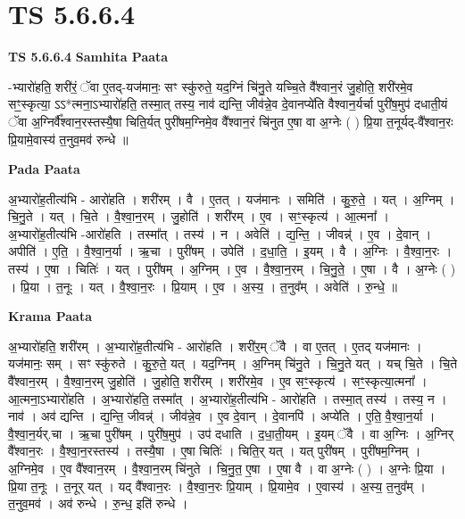 \documentclass[17pt]{extarticle}
\begin{document}
\section{ TS 5.6.6.4 }

\textbf{TS 5.6.6.4 } \newline
\textbf{Samhita Paata} \newline

-भ्यारो॑हति॒ शरी॑रं॒ ॅवा ए॒तद्-यज॑मानः॒ सꣳ स्कु॑रुते॒ यद॒ग्निं चि॑नु॒ते यच्चि॒ते वै᳚श्वान॒रं जु॒होति॒ शरी॑रमे॒व सꣳ॒॒स्कृत्या॒ ऽऽ*त्मना॒ऽभ्यारो॑हति॒ तस्मा॒त् तस्य॒ नाव॑ द्यन्ति॒ जीव॑न्ने॒व दे॒वानप्ये॑ति वैश्वान॒र्यर्चा पुरी॑ष॒मुप॑ दधाती॒यं ॅवा अ॒ग्निर्वै᳚श्वान॒रस्तस्यै॒षा चिति॒र्यत् पुरी॑षम॒ग्निमे॒व वै᳚श्वान॒रं चि॑नुत ए॒षा वा अ॒ग्नेः ( ) प्रि॒या त॒नूर्यद्-वै᳚श्वान॒रः प्रि॒यामे॒वास्य॑ त॒नुव॒मव॑ रुन्धे ॥ \newline

\textbf{Pada Paata} \newline

अ॒भ्यारो॑ह॒तीत्य॑भि - आरो॑हति । शरी॑रम् । वै । ए॒तत् । यज॑मानः । समिति॑ । कु॒रु॒ते॒ । यत् । अ॒ग्निम् । चि॒नु॒ते । यत् । चि॒ते । वै॒श्वा॒न॒रम् । जु॒होति॑ । शरी॑रम् । ए॒व । सꣳ॒॒स्कृत्य॑ । आ॒त्मना᳚ । अ॒भ्यारो॑ह॒तीत्य॑भि -आरो॑हति । तस्मा᳚त् । तस्य॑ । न । अवेति॑ । द्य॒न्ति॒ । जीवन्न्॑ । ए॒व । दे॒वान् । अपीति॑ । ए॒ति॒ । वै॒श्वा॒न॒र्या । ऋ॒चा । पुरी॑षम् । उपेति॑ । द॒धा॒ति॒ । इ॒यम् । वै । अ॒ग्निः । वै॒श्वा॒न॒रः । तस्य॑ । ए॒षा । चितिः॑ । यत् । पुरी॑षम् । अ॒ग्निम् । ए॒व । वै॒श्वा॒न॒रम् । चि॒नु॒ते॒ । ए॒षा । वै । अ॒ग्नेः ( ) । प्रि॒या । त॒नूः । यत् । वै॒श्वा॒न॒रः । प्रि॒याम् । ए॒व । अ॒स्य॒ । त॒नुव᳚म् । अवेति॑ । रु॒न्धे॒ ॥  \newline


\textbf{Krama Paata} \newline

अ॒भ्यारो॑हति॒ शरी॑रम् । अ॒भ्यारो॑ह॒तीत्य॑भि - आरो॑हति । शरी॑र॒म् ॅवै । वा ए॒तत् । ए॒तद् यज॑मानः । यज॑मानः॒ सम् । सꣳ स्कु॑रुते । कु॒रु॒ते॒ यत् । यद॒ग्निम् । अ॒ग्निम् चि॑नु॒ते । चि॒नु॒ते यत् । यच् चि॒ते । चि॒ते वै᳚श्वान॒रम् । वै॒श्वा॒न॒रम् जु॒होति॑ । जु॒होति॒ शरी॑रम् । शरी॑रमे॒व । ए॒व सꣳ॒॒स्कृत्य॑ । सꣳ॒॒स्कृत्या॒त्मना᳚ । आ॒त्मना॒ऽभ्यारो॑हति । अ॒भ्यारो॑हति॒ तस्मा᳚त् । अ॒भ्यारो॑ह॒तीत्य॑भि - आरो॑हति । तस्मा॒त् तस्य॑ । तस्य॒ न । नाव॑ । अव॑ द्यन्ति । द्य॒न्ति॒ जीवन्न्॑ । जीव॑न्ने॒व । ए॒व दे॒वान् । दे॒वानपि॑ । अप्ये॑ति । ए॒ति॒ वै॒श्वा॒न॒र्या । वै॒श्वा॒न॒र्यर्.चा । ऋ॒चा पुरी॑षम् । पुरी॑ष॒मुप॑ । उप॑ दधाति । द॒धा॒ती॒यम् । इ॒यम् ॅवै । वा अ॒ग्निः । अ॒ग्निर् वै᳚श्वान॒रः । वै॒श्वा॒न॒रस्तस्य॑ । तस्यै॒षा । ए॒षा चितिः॑ । चिति॒र् यत् । यत् पुरी॑षम् । पुरी॑षम॒ग्निम् । अ॒ग्निमे॒व । ए॒व वै᳚श्वान॒रम् । वै॒श्वा॒न॒रम् चि॑नुते । चि॒नु॒त॒ ए॒षा । ए॒षा वै । वा अ॒ग्नेः ( ) । अ॒ग्नेः प्रि॒या । प्रि॒या त॒नूः । त॒नूर् यत् । यद् वै᳚श्वान॒रः । वै॒श्वा॒न॒रः प्रि॒याम् । प्रि॒यामे॒व । ए॒वास्य॑ । अ॒स्य॒ त॒नुव᳚म् । त॒नुव॒मव॑ । अव॑ रुन्धे । रु॒न्ध॒ इति॑ रुन्धे । \newline
\end{document}
